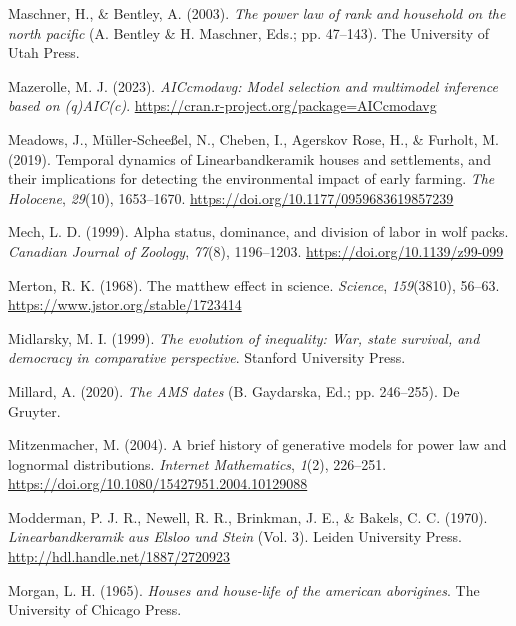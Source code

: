\documentclass[
  12pt,
]{book}
\newlength{\cslhangindent}
\newlength{\cslentryspacingunit} %
\newenvironment{CSLReferences}[2] %
 {%
  \setlength{\parindent}{0pt}
  \ifodd #1
  \let\oldpar\par
  \def\par{\hangindent=\cslhangindent\oldpar}
  \fi
  \setlength{\parskip}{#2\cslentryspacingunit}
 }%
 {}
\begin{document}
\begin{CSLReferences}{1}{0}
\leavevmode{}%
Maschner, H., \& Bentley, A. (2003). \emph{The power law of rank and household on the north pacific} (A. Bentley \& H. Maschner, Eds.; pp. 47--143). The University of Utah Press.

\leavevmode{}%
Mazerolle, M. J. (2023). \emph{AICcmodavg: Model selection and multimodel inference based on (q)AIC(c)}. \url{https://cran.r-project.org/package=AICcmodavg}

\leavevmode{}%
Meadows, J., Müller-Scheeßel, N., Cheben, I., Agerskov Rose, H., \& Furholt, M. (2019). Temporal dynamics of Linearbandkeramik houses and settlements, and their implications for detecting the environmental impact of early farming. \emph{The Holocene}, \emph{29}(10), 1653--1670. \url{https://doi.org/10.1177/0959683619857239}

\leavevmode{}%
Mech, L. D. (1999). Alpha status, dominance, and division of labor in wolf packs. \emph{Canadian Journal of Zoology}, \emph{77}(8), 1196--1203. \url{https://doi.org/10.1139/z99-099}

\leavevmode{}%
Merton, R. K. (1968). The matthew effect in science. \emph{Science}, \emph{159}(3810), 56--63. \url{https://www.jstor.org/stable/1723414}

\leavevmode{}%
Midlarsky, M. I. (1999). \emph{The evolution of inequality: War, state survival, and democracy in comparative perspective}. Stanford University Press.

\leavevmode{}%
Millard, A. (2020). \emph{The AMS dates} (B. Gaydarska, Ed.; pp. 246--255). De Gruyter.

\leavevmode{}%
Mitzenmacher, M. (2004). A brief history of generative models for power law and lognormal distributions. \emph{Internet Mathematics}, \emph{1}(2), 226--251. \url{https://doi.org/10.1080/15427951.2004.10129088}

\leavevmode{}%
Modderman, P. J. R., Newell, R. R., Brinkman, J. E., \& Bakels, C. C. (1970). \emph{Linearbandkeramik aus Elsloo und Stein} (Vol. 3). Leiden University Press. \url{http://hdl.handle.net/1887/2720923}

\leavevmode{}%
Morgan, L. H. (1965). \emph{Houses and house-life of the american aborigines}. The University of Chicago Press.


\end{CSLReferences}
\end{document}
